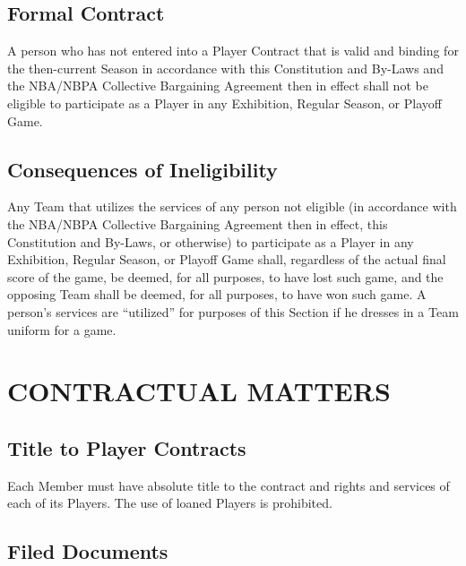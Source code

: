 \documentclass[]{book}
\begin{document}
\hypertarget{formal-contract}{%
\subsection{Formal Contract}\label{formal-contract}}

A person who has not entered into a Player Contract that is valid and binding for the then-current Season in accordance with this Constitution and By-Laws and the NBA/NBPA Collective Bargaining Agreement then in effect shall not be eligible to participate as a Player in any Exhibition, Regular Season, or Playoff Game.

\hypertarget{consequences-of-ineligibility}{%
\subsection{Consequences of Ineligibility}\label{consequences-of-ineligibility}}

Any Team that utilizes the services of any person not eligible (in accordance with the NBA/NBPA Collective Bargaining Agreement then in effect, this Constitution and By-Laws, or otherwise) to participate as a Player in any Exhibition, Regular Season, or Playoff Game shall, regardless of the actual final score of the game, be deemed, for all purposes, to have lost such game, and the opposing Team shall be deemed, for all purposes, to have won such game. A person's services are ``utilized'' for purposes of this Section if he dresses in a Team uniform for a game.

\hypertarget{contractual-matters}{%
\section{CONTRACTUAL MATTERS}\label{contractual-matters}}

\hypertarget{title-to-player-contracts}{%
\subsection{Title to Player Contracts}\label{title-to-player-contracts}}

Each Member must have absolute title to the contract and rights and services of each of its Players. The use of loaned Players is prohibited.

\hypertarget{filed-documents}{%
\subsection{Filed Documents}\label{filed-documents}}
\end{document}
